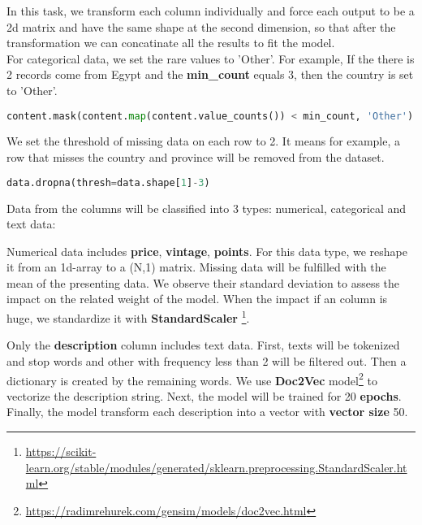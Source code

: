 \documentclass[11pt]{article}
\begin{document}
In this task, we transform each column individually and force each output to be a 2d matrix and have the same shape at the second dimension, so that after the transformation we can concatinate all the results to fit the model.\\

For categorical data, we set the rare values to 'Other'. For example, If the there is 2 records come from Egypt and the \textbf{min\_count} equals 3, then the country is set to 'Other'.
\begin{lstlisting}[language=python]
content.mask(content.map(content.value_counts()) < min_count, 'Other')
\end{lstlisting}

We set the threshold of missing data on each row to 2. It means for example, a row that misses the country and province will be removed from the dataset. 
\begin{lstlisting}[language=python]
data.dropna(thresh=data.shape[1]-3)
\end{lstlisting}

Data from the columns will be classified into 3 types: numerical, categorical and text data:

Numerical data includes \textbf{price}, \textbf{vintage}, \textbf{points}. For this data type, we reshape it from an 1d-array to a (N,1) matrix. Missing data will be fulfilled with the mean of the presenting data. We observe their standard deviation to assess the impact on the related weight of the model. When the impact if an column is huge, we standardize it with \textbf{StandardScaler} \footnote{\url{https://scikit-learn.org/stable/modules/generated/sklearn.preprocessing.StandardScaler.html}}.

Only the \textbf{description} column includes text data. First, texts will be tokenized and stop words and other with frequency less than 2 will be filtered out. Then a dictionary is created by the remaining words. We use \textbf{Doc2Vec} model\footnote{\url{https://radimrehurek.com/gensim/models/doc2vec.html}} to vectorize the description string. Next, the model will be trained for 20 \textbf{epochs}. Finally, the model transform each description into a vector with \textbf{vector size} 50.
\end{document}
